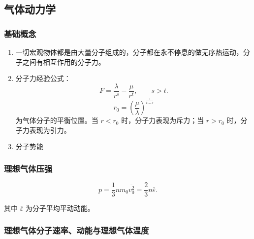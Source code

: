 \documentclass[UTF8,fontset=fandol,zihao=5]{ctexart}
\begin{document}
\subsection{气体动力学}

\subsubsection{基础概念}

\begin{enumerate}
  \item 一切宏观物体都是由大量分子组成的，分子都在永不停息的做无序热运动，分子之间有相互作用的分子力。
  \item 分子力经验公式：
  \[
    F=\frac{\lambda}{r^s}-\frac{\mu}{r^t},
    \qquad s>t.
  \]
  \[
    r_0=\left(\frac{\mu}{\lambda}\right)^{\frac{1}{t-s}}
  \]
  为气体分子的平衡位置。当 \(r<r_0\) 时，分子力表现为斥力；当 \(r>r_0\) 时，分子力表现为引力。
  \item 分子势能
\end{enumerate}

\subsubsection{理想气体压强}

\[
  p=\frac13nm_0\overline{v_0^2}=\frac23n\overline\varepsilon.
\]

其中 \(\overline\varepsilon\) 为分子平均平动动能。

\subsubsection{理想气体分子速率、动能与理想气体温度}
\end{document}
